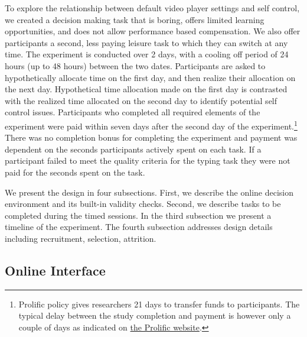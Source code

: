 \documentclass[11pt,a4paper,oneside]{article}
\begin{document}
To explore the relationship between default video player settings and self control, we created a decision making task that is boring, offers limited learning opportunities, and does not allow performance based compensation. We also offer participants a second, less paying leisure task to which they can switch at any time. The experiment is conducted over 2 days, with a cooling off period of 24 hours (up to 48 hours) between the two dates. Participants are asked to hypothetically allocate time on the first day, and then realize their allocation on the next day. Hypothetical time allocation made on the first day is contrasted with the realized time allocated on the second day to identify potential self control issues. Participants who completed all required elements of the experiment were paid within seven days after the second day of the experiment.\footnote{Prolific policy gives researchers 21 days to transfer funds to participants. The typical delay between the study  completion and payment is however only a couple of days as indicated on \href{https://participant-help.prolific.co/hc/en-gb/articles/360021786314-When-will-I-be-paid-for-a-study-}{the Prolific website}.} There was no completion bonus for completing the experiment and payment was dependent on the seconds participants actively spent on each task. If a participant failed to meet the quality criteria for the typing task they were not paid for the seconds spent on the task.

We present the design in four subsections. First, we describe the online decision environment and its built-in validity checks. Second, we describe tasks to be completed during the timed sessions. In the third subsection we present a timeline of the experiment. The fourth subsection addresses design details including recruitment, selection, attrition.


\subsection{Online Interface}

\end{document}

